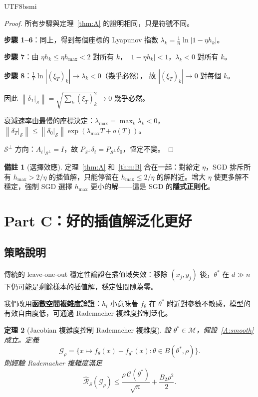 \documentclass[11pt,a4paper]{article}
\newtheorem{theorem}{定理}
\theoremstyle{definition}
\newtheorem{remark}[theorem]{備註}
\newcommand{\cM}{\mathcal{M}}
\newcommand{\cS}{\mathcal{S}}
\newcommand{\cC}{\mathcal{C}}
\newcommand{\cG}{\mathcal{G}}
\newcommand{\norm}[1]{\left\|#1\right\|}
\begin{document}
\begin{CJK}{UTF8}{bsmi}
\begin{proof}
  所有步驟與定理~\ref{thm:A} 的證明相同，只是符號不同。

  \textbf{步驟 1--6}：同上，得到每個座標的 Lyapunov 指數 $\lambda_k=\frac{1}{n}\ln|1-\eta h_k|$。

  \textbf{步驟 7}：由 $\eta h_k\leq\eta h_{\max}<2$ 對所有 $k$，
  $|1-\eta h_k|<1$，$\lambda_k<0$ 對所有 $k$。

  \textbf{步驟 8}：$\frac{1}{T}\ln|(\xi_T)_k|\to\lambda_k<0$（幾乎必然），
  故 $|(\xi_T)_k|\to 0$ 對每個 $k$。

  因此 $\norm{\delta_T|_\cS}=\sqrt{\sum_k(\xi_T)_k^2}\to 0$ 幾乎必然。

  衰減速率由最慢的座標決定：$\lambda_{\max}=\max_k\lambda_k<0$，
  $\norm{\delta_T|_\cS}\leq\norm{\delta_0|_\cS}\exp(\lambda_{\max}T+o(T))$。

  $\cS^\perp$ 方向：$A_i|_{\cS^\perp}=I$，故 $P_{\cS^\perp}\delta_t=P_{\cS^\perp}\delta_0$，恆定不變。
\end{proof}

\begin{remark}[選擇效應]
  定理~\ref{thm:A} 和~\ref{thm:B} 合在一起：對給定 $\eta$，SGD 排斥所有 $h_{\max}>2/\eta$ 的插值解，只能停留在 $h_{\max}\leq 2/\eta$ 的解附近。增大 $\eta$ 使更多解不穩定，強制 SGD 選擇 $h_{\max}$ 更小的解——這是 SGD 的\textbf{隱式正則化}。
\end{remark}

\section{Part C：好的插值解泛化更好}

\subsection{策略說明}

傳統的 leave-one-out 穩定性論證在插值域失效：移除 $(x_j,y_j)$ 後，$\theta^*$ 在 $d\gg n$ 下仍可能是剩餘樣本的插值解，穩定性間隙為零。

我們改用\textbf{函數空間複雜度}論證：$h_i$ 小意味著 $f_\theta$ 在 $\theta^*$ 附近對參數不敏感，模型的有效自由度低，可通過 Rademacher 複雜度控制泛化。

\begin{theorem}[Jacobian 複雜度控制 Rademacher 複雜度]\label{thm:rad}
  設 $\theta^*\in\cM$，假設~\ref{A:smooth} 成立。定義
  \[
    \cG_\rho=\{x\mapsto f_\theta(x)-f_{\theta^*}(x):\theta\in B(\theta^*,\rho)\}.
  \]
  則經驗 Rademacher 複雜度滿足
  \begin{equation}\label{eq:rad}
    \hat{\mathcal{R}}_S(\cG_\rho)\leq\frac{\rho\,\cC(\theta^*)}{\sqrt{n}}+\frac{B_2\rho^2}{2}.
  \end{equation}
\end{theorem}


\end{CJK}
\end{document}
